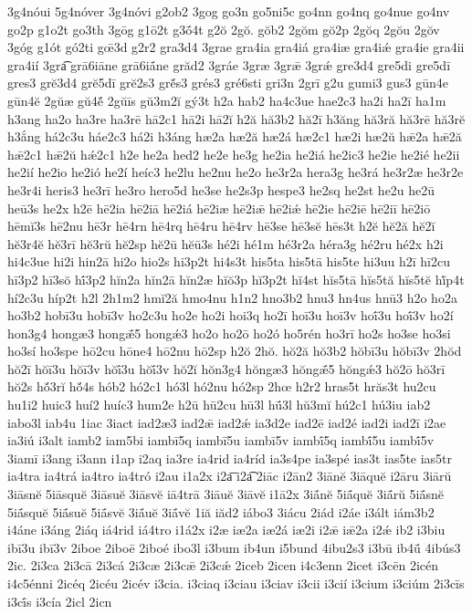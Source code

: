 {3g4nóui
5g4nóver
3g4nóvi
g2ob2
3gog
go3n
go5ni5c
go4nn
go4nq
go4nue
go4nv
go2p
g1o2t
go3th
3gōg
g1ō2t
g3ṓ4t
g2ŏ
2gŏ.
gŏb2
2gŏm
gŏ2p
2gŏq
2gŏu
2gŏv
3góg
g1ót
gó2ti
gœ̄3d
g2r2
gra3d4
3grae
gra4ia
gra4iá
gra4iæ
gra4iǽ
gra4ie
gra4ii
gra4ií
3gra͡
grā6iāne
grā6iā́ne
grăd2
3gráe
3græ
3grǣ
3grǽ
gre3d4
gre5di
gre5dī
gres3
grĕ3d4
grĕ5dī
grĕ2s3
grĕ́s3
grés3
gré6sti
gri3n
2grī
g2u
gumi3
gus3
gūn4e
gūn4ĕ
2gŭæ
gŭ4ĕ́
2gŭīs
gŭ3m2ĭ
gý3t
h2a
hab2
ha4c3ue
hae2c3
ha2i
ha2ī
ha1m
h3ang
ha2o
ha3re
ha3rē
hā2c1
hā2i
hā2ĭ
h2ă
hă3b2
hă2ī
h3ăng
hă3ră
hă3rē
hă3rĕ
h3ắng
há2c3u
háe2c3
há2i
h3áng
hæ2a
hæ2ă
hæ2á
hæ2c1
hæ2i
hæ2ŭ
hǣ2a
hǣ2ă
hǣ2c1
hǣ2ŭ
hǽ2c1
h2e
he2a
hed2
he2e
he3g
he2ia
he2iá
he2ic3
he2ie
he2ié
he2ii
he2ií
he2io
he2ió
he2í
heíc3
he2lu
he2nu
he2o
he3r2a
hera3g
he3rá
he3r2æ
he3r2e
he3r4i
heris3
he3rī
he3ro
hero5d
he3se
he2s3p
hespe3
he2sq
he2st
he2u
he2ū
heū3s
he2x
h2ē
hē2ia
hē2iā
hē2iá
hē2iæ
hē2iǣ
hē2iǽ
hē2ie
hē2iē
hē2iī
hē2iō
hēmĭ3s
hē2nu
hē3r
hē4rn
hē4rq
hē4ru
hē4rv
hē3se
hē3sĕ
hēs3t
h2ĕ
hĕ2ă
hĕ2ĭ
hĕ3r4ĕ
hĕ3rī
hĕ3rŭ
hĕ2sp
hĕ2ū
hĕū3s
hé2i
hé1m
hé3r2a
héra3g
hé2ru
hé2x
h2i
hi4c3ue
hi2i
hin2ā
hi2o
hio2s
hi3p2t
hi4s3t
his5ta
his5tā
his5te
hi3uu
h2ī
hī2cu
hī3p2
hī3sŏ
hī́3p2
hĭn2a
hĭn2ā
hĭn2æ
hĭŏ3p
hĭ3p2t
hĭ4st
hĭs5tā
hĭs5tă
hĭs5tĕ
hĭ́p4t
hí2c3u
híp2t
h2l
2h1m2
hmĭ2ă
hmo4nu
h1n2
hno3b2
hnu3
hn4us
hnū3
h2o
ho2a
ho3b2
hobī3u
hobī3v
ho2c3u
ho2e
ho2i
hoi3q
ho2ī
hoī3u
hoī3v
hoī́3u
hoī́3v
ho2í
hon3g4
hongæ3
hongǣ́5
hongǽ3
ho2o
ho2ō
ho2ó
ho5rén
ho3rī
ho2s
ho3se
ho3si
ho3sí
ho3spe
hō2cu
hōne4
hō2nu
hō2sp
h2ŏ
2hŏ.
hŏ2ă
hŏ3b2
hŏbī3u
hŏbī3v
2hŏd
hŏ2ī
hŏī3u
hŏī3v
hŏī́3u
hŏī́3v
hŏ2ĭ
hŏn3g4
hŏngæ3
hŏngǣ́5
hŏngǽ3
hŏ2ō
hŏ3rī
hŏ2s
hŏ́3rĭ
hŏ́4s
hób2
hó2c1
hó3l
hó2nu
hó2sp
2hœ
h2r2
hras5t
hrăs3t
hu2cu
hu1i2
huic3
huí2
huíc3
hum2e
h2ū
hū2cu
hū3l
hū́3l
hŭ3mĭ
hú2c1
hú3iu
iab2
iabo3l
iab4u
1iac
3iact
iad2æ3
iad2ǣ
iad2ǽ
ia3d2e
iad2ē
iad2é
iad2i
iad2ī
i2ae
ia3iú
i3alt
iamb2
iam5bi
iambī5q
iambī5u
iambī5v
iambī́5q
iambī́5u
iambī́5v
3iamī
i3ang
i3ann
i1ap
i2aq
ia3re
ia4rid
ia4ríd
ia3s4pe
ia3spé
ias3t
ias5te
ias5tr
ia4tra
ia4trá
ia4tro
ia4tró
i2au
i1a2x
i2a͞
i2a͡
2iāc
i2ān2
3iānĕ
3iāquĕ
i2āru
3iārŭ
3iāsnĕ
5iāsquĕ
3iāsuĕ
3iāsvĕ
iā4trā
3iāuĕ
3iāvĕ
i1ā2x
3iā́nĕ
5iā́quĕ
3iā́rŭ
5iā́snĕ
5iā́squĕ
5iā́suĕ
5iā́svĕ
3iā́uĕ
3iā́vĕ
1iă
iăd2
iábo3
3iácu
2iád
i2áe
i3ált
iám3b2
i4áne
i3áng
2iáq
iá4rid
iá4tro
i1á2x
i2æ
iæ2a
iæ2á
iæ2i
i2ǣ
iǣ2a
i2ǽ
ib2
i3biu
ibī3u
ibī3v
2iboe
2iboē
2iboé
ibo3l
i3bum
ib4un
i5bund
4ibu2s3
i3bū
ib4ū́
4ibús3
2ic.
2i3ca
2i3cā
2i3cá
2i3cæ
2i3cǣ
2i3cǽ
2iceb
2icen
i4c3enn
2icet
i3cēn
2icén
i4c5énni
2icéq
2icéu
2icév
i3cia.
i3ciaq
i3ciau
i3ciav
i3cii
i3cií
i3cium
i3ciúm
2i3cīs
i3cī́s
i3cía
2icl
2icn
}
